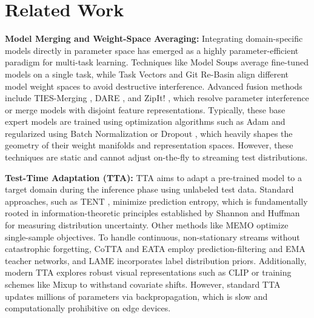 \documentclass{article}
\theoremstyle{plain}
\theoremstyle{definition}
\theoremstyle{remark}
\begin{document}
\section{Related Work}
\label{submission:related}

\textbf{Model Merging and Weight-Space Averaging:} Integrating domain-specific models directly in parameter space has emerged as a highly parameter-efficient paradigm for multi-task learning. Techniques like Model Soups \cite{wortsman22soups} average fine-tuned models on a single task, while Task Vectors \cite{ilharco22taskvectors} and Git Re-Basin \cite{ainsworth22gitrebasin} align different model weight spaces to avoid destructive interference. Advanced fusion methods include TIES-Merging \cite{yadav23ties}, DARE \cite{yu23dare}, and ZipIt! \cite{stoica23zipit}, which resolve parameter interference or merge models with disjoint feature representations. Typically, these base expert models are trained using optimization algorithms such as Adam \cite{kingma14adam} and regularized using Batch Normalization \cite{ioffe15batchnorm} or Dropout \cite{srivastava14dropout}, which heavily shapes the geometry of their weight manifolds and representation spaces. However, these techniques are static and cannot adjust on-the-fly to streaming test distributions.

\textbf{Test-Time Adaptation (TTA):} TTA aims to adapt a pre-trained model to a target domain during the inference phase using unlabeled test data. Standard approaches, such as TENT \cite{wang20tent}, minimize prediction entropy, which is fundamentally rooted in information-theoretic principles established by Shannon \cite{shannon48shannon} and Huffman \cite{huffman52huffman} for measuring distribution uncertainty. Other methods like MEMO \cite{zhang22memo} optimize single-sample objectives. To handle continuous, non-stationary streams without catastrophic forgetting, CoTTA \cite{wang22cotta} and EATA \cite{niu22eata} employ prediction-filtering and EMA teacher networks, and LAME \cite{iwasawa22lame} incorporates label distribution priors. Additionally, modern TTA explores robust visual representations such as CLIP \cite{radford21clip} or training schemes like Mixup \cite{li18mixup} to withstand covariate shifts. However, standard TTA updates millions of parameters via backpropagation, which is slow and computationally prohibitive on edge devices.
\end{document}
